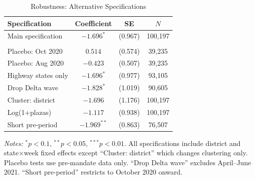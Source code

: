 \begin{table}[t]
\centering
\caption{Robustness: Alternative Specifications}
\label{tab:robustness}
\small
\begin{tabular}{lccc}
\toprule
Specification & Coefficient & SE & $N$ \\
\midrule
Main specification & $-1.696^{*}$ & (0.967) & 100,197 \\
\addlinespace
\multicolumn{4}{l}{\textit{Placebo tests}} \\
Placebo: Oct 2020 & $0.514$ & (0.574) & 39,235 \\
Placebo: Aug 2020 & $-0.423$ & (0.507) & 39,235 \\
Highway states only & $-1.696^{*}$ & (0.977) & 93,105 \\
Drop Delta wave & $-1.828^{*}$ & (1.019) & 90,605 \\
Cluster: district & $-1.696$ & (1.176) & 100,197 \\
Log(1+plazas) & $-1.117$ & (0.938) & 100,197 \\
Short pre-period & $-1.969^{**}$ & (0.863) & 76,507 \\
\bottomrule
\end{tabular}
\begin{tablenotes}
\item \textit{Notes:} $^{*}p<0.1$, $^{**}p<0.05$, $^{***}p<0.01$. All specifications include district and state$\times$week fixed effects except ``Cluster: district'' which changes clustering only. Placebo tests use pre-mandate data only. ``Drop Delta wave'' excludes April--June 2021. ``Short pre-period'' restricts to October 2020 onward.
\end{tablenotes}
\end{table}

